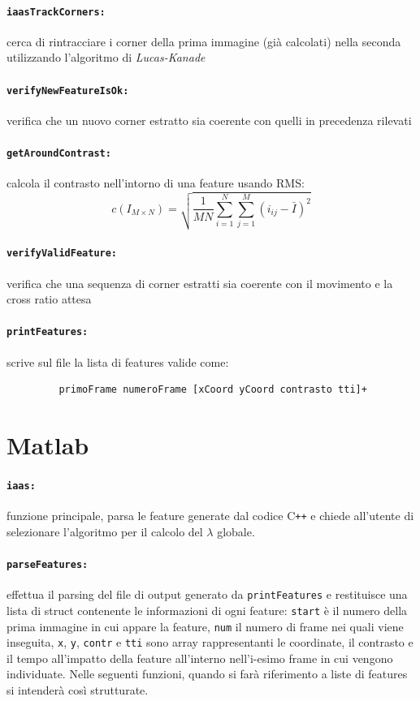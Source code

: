 \documentclass[12pt]{report}
\begin{document}
\paragraph*{\verb_iaasTrackCorners:_} cerca di rintracciare i corner della prima immagine (gi\`a calcolati) nella seconda utilizzando l'algoritmo di \emph{Lucas-Kanade}

\paragraph*{\verb_verifyNewFeatureIsOk:_} verifica che un nuovo corner estratto sia coerente con quelli in precedenza rilevati

\paragraph*{\verb_getAroundContrast:_} calcola il contrasto nell'intorno di una feature usando RMS: $$ c\left(I_{M\times N}\right) = \sqrt{\frac{1}{MN}\sum_{i=1}^N\sum_{j=1}^M(i_{ij}-\bar{I})^2} $$

\paragraph*{\verb_verifyValidFeature:_} verifica che una sequenza di corner estratti sia coerente con il movimento e la cross ratio attesa

\paragraph*{\verb_printFeatures:_} scrive sul file la lista di features valide come:
\begin{verbatim}
	     primoFrame numeroFrame [xCoord yCoord contrasto tti]+
\end{verbatim}


\section{Matlab}

\paragraph*{\verb_iaas:_} funzione principale, parsa le feature generate dal codice C\verb|++| e chiede all'utente di selezionare l'algoritmo per il calcolo del $\lambda$ globale.

\paragraph*{\verb_parseFeatures:_} effettua il parsing del file di output generato da \verb|printFeatures| e restituisce una lista di struct contenente le informazioni di ogni feature: \verb|start| \`e il numero della prima immagine in cui appare la feature, \verb|num| il numero di frame nei quali viene inseguita, \verb|x|, \verb|y|, \verb|contr| e \verb|tti| sono array rappresentanti le coordinate, il contrasto e il tempo all'impatto della feature all'interno nell'i-esimo frame in cui vengono individuate. Nelle seguenti funzioni, quando si far\`a riferimento a liste di features si intender\`a cos\`i strutturate.
\end{document}
